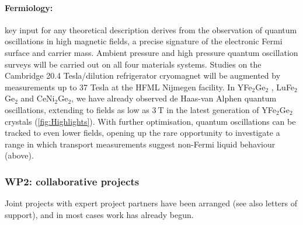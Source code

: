 \paragraph{Fermiology:}
key input for any
theoretical description derives from the observation of quantum oscillations in high magnetic fields, a precise signature of the electronic Fermi surface and
carrier mass. Ambient pressure and high pressure quantum oscillation surveys will be carried out on all four materials systems.
Studies on the Cambridge 20.4 Tesla/dilution refrigerator cryomagnet will be augmented by measurements up to 37 Tesla at the HFML Nijmegen facility.
In YFe$_2$Ge$_2$ , LuFe$_2$Ge$_2$ and CeNi$_2$Ge$_2$, we have already observed de Haas-van Alphen quantum oscillations, extending to fields as low as $\SI{3}{\tesla}$ in the latest generation of YFe$_2$Ge$_2$ crystals (\autoref{fig:Highlights}). With further optimisation, quantum oscillations can be tracked to even lower fields, opening up the rare opportunity to investigate a range in which transport measurements suggest non-Fermi liquid behaviour (above). 

\vspace{ -1.0em}

\subsubsection*{WP2: collaborative projects}
\noindent
Joint projects with expert project partners have been arranged (see also letters of support), and in most cases  work has already begun. 


